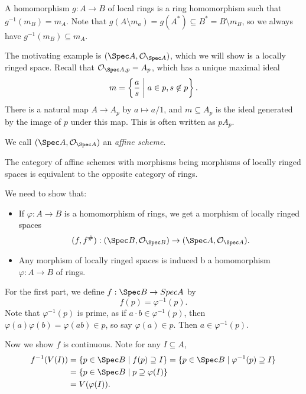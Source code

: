 \documentclass[12pt]{article}
\begin{document}
A homomorphism  $g : A \to B$ of local rings is a ring homomorphism such that $g^{-1}(m_B) = m_A$. Note that $g(A \setminus m_a) = g(A^\ast) \subseteq B^\ast = B \setminus m_B$, so we always have $g^{-1}(m_B) \subseteq m_A$.

The motivating example is $(\Spec A, \mathcal{O}_{\Spec A})$, which we will show is a locally ringed space. Recall that $\mathcal{O}_{\Spec A, p} = A_p$, which has a unique maximal ideal
\[
m = \left\{ \frac{a}{s} \biggm| a \in p, s \not \in p\right\}.
\]
There is a natural map $A \to A_p$ by $a \mapsto a/1$, and $m \subseteq A_p$ is the ideal generated by the image of $p$ under this map. This is often written as $p A_p$.

We call $(\Spec A, \mathcal{O}_{\Spec A})$ an \emph{affine scheme}.

\begin{theorem}
	The category of affine schemes with morphisms being morphisms of locally ringed spaces is equivalent to the opposite category of rings.
\end{theorem}

\begin{proofbox}
	We need to show that:
	\begin{itemize}
		\item If $\varphi : A \to B$ is a homomorphism of rings, we get a morphism of locally ringed spaces
			\[
				(f, f^{\#}) : (\Spec B, \mathcal{O}_{\Spec B}) \to (\Spec A, \mathcal{O}_{\Spec A}).
			\]
		\item Any morphism of locally ringed spaces is induced b a homomorphism $\varphi : A \to B$ of rings.
	\end{itemize}
	For the first part, we define $f : \Spec B \to Spec A$ by
	\[
	f(p) = \varphi^{-1}(p).
	\]
	Note that $\varphi^{-1}(p)$ is prime, as if $a \cdot b \in \varphi^{-1}(p)$, then $\varphi(a) \varphi(b) = \varphi(ab) \in p$, so say $\varphi(a) \in p$. Then $a \in \varphi^{-1}(p)$.

	Now we show $f$ is continuous. Note for any $I \subseteq A$,
	\begin{align*}
		f^{-1}(V(I)) &= \{p \in \Spec B \mid f(p) \supseteq I\} = \{p \in \Spec B \mid \varphi^{-1}(p) \supseteq I\} \\
			     &= \{p \in \Spec B \mid p \supseteq \varphi(I)\} \\
			     &= V(\varphi(I)).
	\end{align*}
	
\end{proofbox}



\newpage

\printindex
\end{document}
